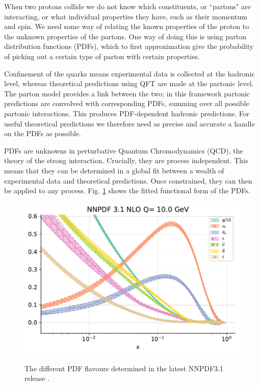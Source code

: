 \documentclass[a4paper,12pt,oneside,openright]{book}
\numberwithin{equation}{section}
\numberwithin{figure}{section}
\numberwithin{table}{section}
\begin{document}
When two protons collide we do not know which constituents,
or ``partons" are interacting, or what individual properties they have, such as their momentum and spin. We need
some way of relating the known properties of the proton to the unknown properties of the partons.
One way of doing this is using parton distribution functions (PDFs), which to first approximation give the
probability of picking out a certain type of parton with certain properties.

Confinement of the quarks means experimental data is collected at the hadronic level, whereas theoretical predictions using QFT are made at the partonic level. The parton model provides a
link between the two; in this framework partonic predictions
are convolved with corresponding PDFs, summing over all possible partonic interactions. This produces PDF-dependent
hadronic predictions. For useful theoretical predictions we therefore need as precise and accurate a handle on the PDFs as possible.

PDFs are unknowns in perturbative Quantum Chromodynamics (QCD), the theory of
the strong interaction. Crucially, they are process independent. This means that
they can be determined in a global fit between a wealth of experimental data and
theoretical predictions. Once constrained, they can then be applied to any process. Fig. \ref{fig:pdfs} shows the fitted functional form of the PDFs.
\begin{figure}[H]
\centering
\includegraphics[width=\textwidth]{pdfflavourplot.pdf}
\label{fig:pdfs}
\caption{The different PDF flavours determined in the latest NNPDF3.1 release \cite{Ball:2017nwa}.}
\end{figure}
\end{document}
